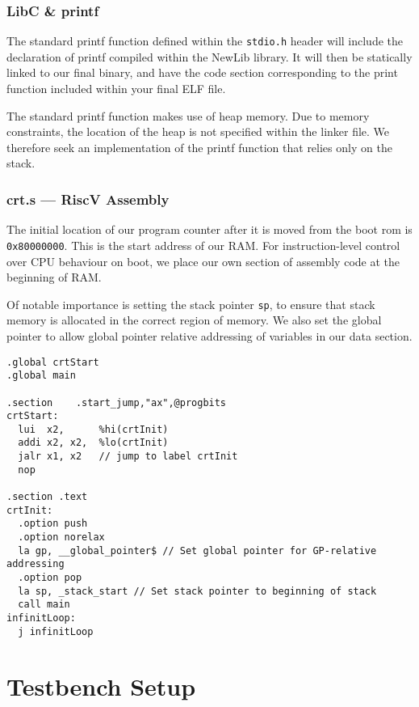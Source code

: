 \documentclass[a4paper,8pt]{report}
\begin{document}
\subsubsection{LibC \& printf}
The standard printf function defined within the \texttt{stdio.h} header will
include the declaration of printf compiled within the NewLib library. It will
then be statically linked to our final binary, and have the code section
corresponding to the print function included within your final ELF file.

The standard printf function makes use of heap memory. Due to memory
constraints, the location of the heap is not specified within the linker file.
We therefore seek an implementation of the printf function that relies only on
the stack. 

\subsubsection{crt.s --- RiscV Assembly}
The initial location of our program counter after it is moved from the boot rom
is \texttt{0x80000000}. This is the start address of our RAM. For
instruction-level control over CPU behaviour on boot, we place our own section
of assembly code at the beginning of RAM.

Of notable importance is setting the stack pointer \texttt{sp}, to ensure that
stack memory is allocated in the correct region of memory. We also set the
global pointer to allow global pointer relative addressing of variables in our
data section.


\lstset{language=[RISC-V]Assembler, style=customrv}
\begin{lstlisting}
.global crtStart
.global main

.section	.start_jump,"ax",@progbits
crtStart:
  lui  x2,      %hi(crtInit)
  addi x2, x2,  %lo(crtInit)
  jalr x1, x2   // jump to label crtInit
  nop

.section .text
crtInit:
  .option push
  .option norelax
  la gp, __global_pointer$ // Set global pointer for GP-relative addressing
  .option pop
  la sp, _stack_start // Set stack pointer to beginning of stack
  call main
infinitLoop:
  j infinitLoop

\end{lstlisting}
\lstset{}

\section{Testbench Setup}
\end{document}
